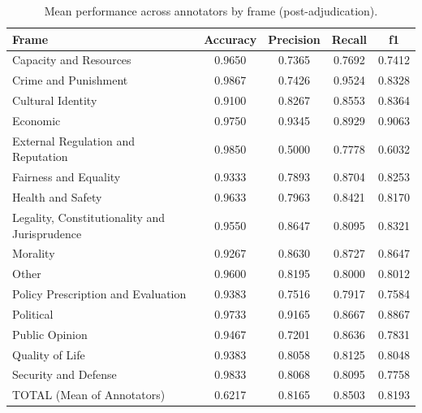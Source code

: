 \documentclass[
10pt, %
a4paper, %
oneside, %
headinclude,footinclude, %
] {book}%
\begin{document}
\begin{table}[htbp]
\centering
\small
\begin{tabular}{|l|c|c|c|c|}
\hline
\textbf{Frame} & \textbf{Accuracy} & \textbf{Precision} & \textbf{Recall} & \textbf{f1} \\
\hline
Capacity and Resources & 0.9650 & 0.7365 & 0.7692 & 0.7412 \\\hline
Crime and Punishment & 0.9867 & 0.7426 & 0.9524 & 0.8328 \\\hline
Cultural Identity & 0.9100 & 0.8267 & 0.8553 & 0.8364 \\\hline
Economic & 0.9750 & 0.9345 & 0.8929 & 0.9063 \\\hline
External Regulation and Reputation & 0.9850 & 0.5000 & 0.7778 & 0.6032 \\\hline
Fairness and Equality & 0.9333 & 0.7893 & 0.8704 & 0.8253 \\\hline
Health and Safety & 0.9633 & 0.7963 & 0.8421 & 0.8170 \\\hline
Legality, Constitutionality and Jurisprudence & 0.9550 & 0.8647 & 0.8095 & 0.8321 \\\hline
Morality & 0.9267 & 0.8630 & 0.8727 & 0.8647 \\\hline
Other & 0.9600 & 0.8195 & 0.8000 & 0.8012 \\\hline
Policy Prescription and Evaluation & 0.9383 & 0.7516 & 0.7917 & 0.7584 \\\hline
Political & 0.9733 & 0.9165 & 0.8667 & 0.8867 \\\hline
Public Opinion & 0.9467 & 0.7201 & 0.8636 & 0.7831 \\\hline
Quality of Life & 0.9383 & 0.8058 & 0.8125 & 0.8048 \\\hline
Security and Defense & 0.9833 & 0.8068 & 0.8095 & 0.7758 \\\hline
TOTAL (Mean of Annotators) & 0.6217 & 0.8165 & 0.8503 & 0.8193 \\
\hline
\end{tabular}
\caption{Mean performance across annotators by frame (post-adjudication).}
\label{tab:post_mean_annotator_performance}
\end{table}

\newpage
\end{document}
